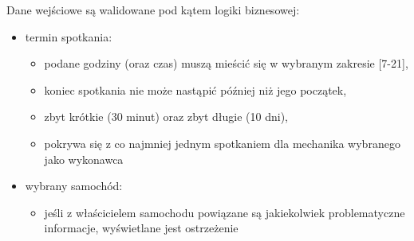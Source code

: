 	Dane wejściowe są walidowane pod kątem logiki biznesowej:
	\begin{itemize}
		\item termin spotkania:
		\begin{itemize}
			\item podane godziny (oraz czas) muszą mieścić się w wybranym zakresie [7-21],
			\item koniec spotkania nie może nastąpić później niż jego początek,
			\item zbyt krótkie (30 minut) oraz zbyt długie (10 dni),
			\item pokrywa się z co najmniej jednym spotkaniem dla mechanika wybranego jako wykonawca
		\end{itemize} 
		\item wybrany samochód:
		\begin{itemize}
			\item jeśli z właścicielem samochodu powiązane są jakiekolwiek problematyczne informacje, wyświetlane jest ostrzeżenie
		\end{itemize}
	\end{itemize}